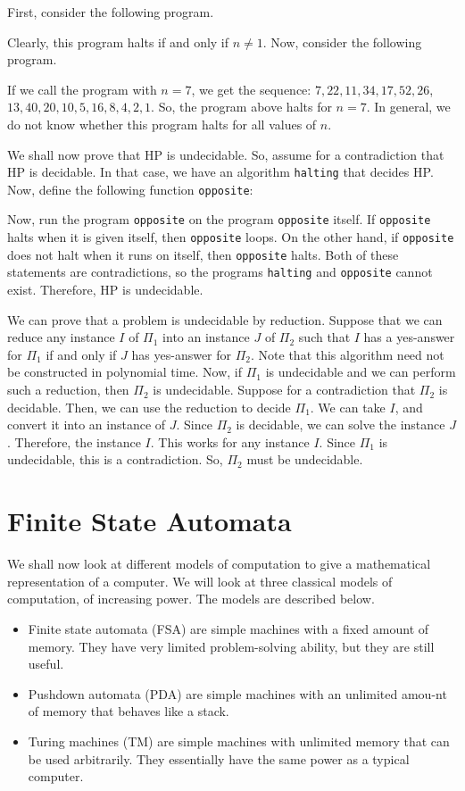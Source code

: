 \documentclass[a4paper, openany]{memoir}
\begin{document}
First, consider the following program.

Clearly, this program halts if and only if $n \neq 1$. Now, consider the following program.

If we call the program with $n = 7$, we get the sequence: $7, 22, 11, 34, 17, 52, 26$, $13, 40, 20, 10, 5, 16, 8, 4, 2, 1$. So, the program above halts for $n = 7$. In general, we do not know whether this program halts for all values of $n$.

We shall now prove that HP is undecidable. So, assume for a contradiction that HP is decidable. In that case, we have an algorithm \texttt{halting} that decides HP. Now, define the following function \texttt{opposite}:

Now, run the program \texttt{opposite} on the program \texttt{opposite} itself. If \texttt{opposite} halts when it is given itself, then \texttt{opposite} loops. On the other hand, if \texttt{opposite} does not halt when it runs on itself, then \texttt{opposite} halts. Both of these statements are contradictions, so the programs \texttt{halting} and \texttt{opposite} cannot exist. Therefore, HP is undecidable.

We can prove that a problem is undecidable by reduction. Suppose that we can reduce any instance $I$ of $\Pi_1$ into an instance $J$ of $\Pi_2$ such that $I$ has a yes-answer for $\Pi_1$ if and only if $J$ has yes-answer for $\Pi_2$. Note that this algorithm need not be constructed in polynomial time. Now, if $\Pi_1$ is undecidable and we can perform such a reduction, then $\Pi_2$ is undecidable. Suppose for a contradiction that $\Pi_2$ is decidable. Then, we can use the reduction to decide $\Pi_1$. We can take $I$, and convert it into an instance of $J$. Since $\Pi_2$ is decidable, we can solve the instance $J$. Therefore, the instance $I$. This works for any instance $I$. Since $\Pi_1$ is undecidable, this is a contradiction. So, $\Pi_2$ must be undecidable.
\newpage

\section{Finite State Automata}
We shall now look at different models of computation to give a mathematical representation of a computer. We will look at three classical models of computation, of increasing power. The models are described below.
\begin{itemize}
    \item Finite state automata (FSA) are simple machines with a fixed amount of memory. They have very limited problem-solving ability, but they are still useful. 
    \item Pushdown automata (PDA) are simple machines with an unlimited amou-nt of memory that behaves like a stack.
    \item Turing machines (TM) are simple machines with unlimited memory that can be used arbitrarily. They essentially have the same power as a typical computer.
\end{itemize}
\end{document}
